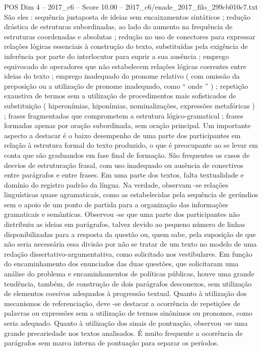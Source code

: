 \begin{textsample}{POS Dim 4 – 2017\_c6 – Score 10.00 – 2017\_c6/enade\_2017\_filo\_299cb010c7.txt}
São eles : sequência justaposta de ideias sem encaixamentos sintáticos ; redução drástica de estruturas subordinadas, ao lado do aumento na frequência de estruturas coordenadas e absolutas ; redução no uso de conectores para expressar relações lógicas essenciais à construção do texto, substituídas pela exigência de inferência por parte do interlocutor para suprir a sua ausência ; emprego equivocado de operadores que não estabelecem relações lógicas coerentes entre ideias do texto ; emprego inadequado do pronome relativo ( com omissão da preposição ou a utilização de pronome inadequado, como “ onde ” ) ; repetição exaustiva de termos sem a utilização de procedimentos mais sofisticados de substituição ( hiperonímias, hiponímias, nominalizações, expressões metafóricas ) ; frases fragmentadas que comprometem a estrutura lógico-gramatical ; frases formadas apenas por oração subordinada, sem oração principal.
Um importante aspecto a destacar é o baixo desempenho de uma parte dos participantes em relação à estrutura formal do texto produzido, o que é preocupante ao se levar em conta que são graduandos em fase final de formação.
São frequentes os casos de desvios de estruturação frasal, com uso inadequado ou ausência de conectivos entre parágrafos e entre frases.
Em uma parte dos textos, falta textualidade e domínio do registro padrão da língua.
Na verdade, observam -se relações linguísticas quase agramaticais, como as estabelecidas pela sequência de gerúndios sem o apoio de um ponto de partida para a organização das informações gramaticais e semânticas.
Observou -se que uma parte dos participantes não distribuiu as ideias em parágrafos, talvez devido ao pequeno número de linhas disponibilizadas para a resposta da questão ou, quem sabe, pela suposição de que não seria necessária essa divisão por não se tratar de um texto no modelo de uma redação dissertativo-argumentativa, como solicitado nos vestibulares.
Em função do encaminhamento dos enunciados das duas questões, que solicitaram uma análise do problema e encaminhamentos de políticas públicas, houve uma grande tendência, também, de construção de dois parágrafos desconexos, sem utilização de elementos coesivos adequados à progressão textual.
Quanto à utilização dos mecanismos de referenciação, deve -se destacar a ocorrência de repetições de palavras ou expressões sem a utilização de termos sinônimos ou pronomes, como seria adequado.
Quanto à utilização dos sinais de pontuação, observou -se uma grande precariedade nos textos analisados.
É muito frequente a ocorrência de parágrafos sem marca interna de pontuação para separar os períodos.

\end{textsample}
